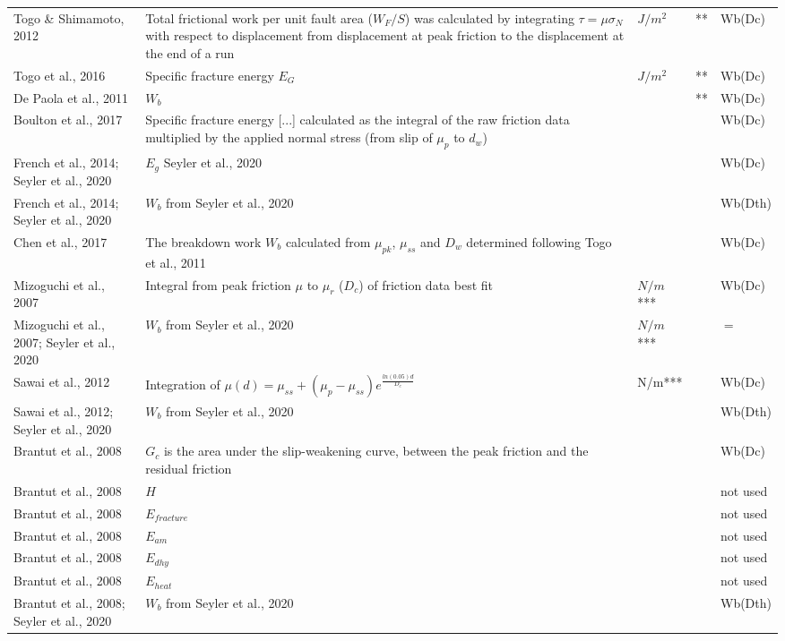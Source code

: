 \documentclass[12pt]{article}
\begin{document}
\begin{longtable}{|p{3.5 cm}|p{6.5 cm}|p{1.25 cm}|p{1.25 cm}|p{1.5 cm}|}
Togo \& Shimamoto, 2012 & Total frictional work per unit fault area ($W_F/S$) was calculated by integrating $\tau = \mu \sigma_N$ with respect to displacement from displacement at peak friction to the displacement at the end of a run & $J/m^2$ & ** & Wb(Dc) \\
Togo et al., 2016 & Specific fracture energy $E_G$ & $J/m^2$ & ** & Wb(Dc) \\
De Paola et al., 2011 & $W_b$ & & ** & Wb(Dc) \\
Boulton et al., 2017 & Specific fracture energy [...] calculated as the integral of the raw friction data multiplied by the applied normal stress (from slip of $\mu_p$ to $d_w$) & & & Wb(Dc) \\
French et al., 2014; Seyler et al., 2020 & \( \displaystyle E_g \)  Seyler et al., 2020 & & & Wb(Dc) \\
French et al., 2014; Seyler et al., 2020 & \( \displaystyle W_b \) from Seyler et al., 2020 & & & Wb(Dth) \\
Chen et al., 2017 & The breakdown work $W_b$ calculated from $\mu_{pk}$, $\mu_{ss}$ and $D_w$ determined following Togo et al., 2011 & & & Wb(Dc) \\
Mizoguchi et al., 2007 & Integral from peak friction $\mu$ to $\mu_r$ ($D_c$) of friction data best fit & $N/m$*** & & Wb(Dc) \\
Mizoguchi et al., 2007; Seyler et al., 2020 & \( \displaystyle W_b \) from Seyler et al., 2020 & $N/m$*** & & $=$ \\
Sawai et al., 2012 & Integration of \( \displaystyle \mu(d) = \mu_{ss}+(\mu_p-\mu_{ss}) e^{\frac{ln(0.05) d}{D_c}} \) & N/m*** & & Wb(Dc) \\
Sawai et al., 2012; Seyler et al., 2020 & \( \displaystyle W_b \) from Seyler et al., 2020 & & & Wb(Dth) \\
Brantut et al., 2008 & $G_c$ is the area under the slip-weakening curve, between the peak friction and the residual friction & & & Wb(Dc) \\
Brantut et al., 2008 & \( \displaystyle H\) & & & not used \\
Brantut et al., 2008 & \( \displaystyle E_{fracture}\) & & & not used \\
Brantut et al., 2008 & \( \displaystyle E_{am}\) & & & not used \\
Brantut et al., 2008 & \( \displaystyle E_{dhy}\) & & & not used \\
Brantut et al., 2008 & \( \displaystyle E_{heat}\) & & & not used \\
Brantut et al., 2008; Seyler et al., 2020 & \( \displaystyle W_b \) from Seyler et al., 2020 & & & Wb(Dth) \\

\end{longtable}
\end{document}
